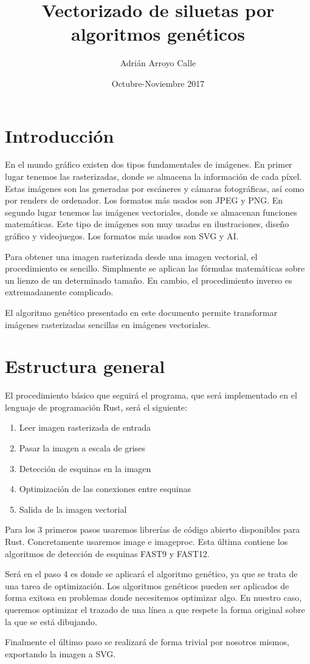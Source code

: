 \documentclass{report}
\title{Vectorizado de siluetas por algoritmos genéticos}
\author{Adrián Arroyo Calle}
\date{ Octubre-Noviembre 2017}
\begin{document}
\maketitle

\chapter{Introducción}
En el mundo gráfico existen dos tipos fundamentales de imágenes. En primer lugar tenemos las rasterizadas, donde se almacena la información de cada píxel. Estas imágenes son las generadas por escáneres y cámaras fotográficas, así como por renders de ordenador. Los formatos más usados son JPEG y PNG. En segundo lugar tenemos las imágenes vectoriales, donde se almacenan funciones matemáticas. Este tipo de imágenes son muy usadas en ilustraciones, diseño gráfico y videojuegos. Los formatos más usados son SVG y AI. 

Para obtener una imagen rasterizada desde una imagen vectorial, el procedimiento es sencillo. Simplmente se aplican las fórmulas matemáticas sobre un lienzo de un determinado tamaño. En cambio, el procedimiento inverso es extremadamente complicado. 

El algoritmo genético presentado en este documento permite transformar imágenes rasterizadas sencillas en imágenes vectoriales.

\chapter{Estructura general}

El procedimiento básico que seguirá el programa, que será implementado en el lenguaje 
de programación Rust\cite{Matsakis:2014:RL:2692956.2663188}, será el siguiente:

\begin{enumerate}
	\item Leer imagen rasterizada de entrada
	\item Pasar la imagen a escala de grises
	\item Detección de esquinas en la imagen
	\item Optimización de las conexiones entre esquinas
	\item Salida de la imagen vectorial
\end{enumerate}

Para los 3 primeros pasos usaremos librerías de código abierto disponibles para Rust. Concretamente
usaremos image e imageproc. Esta última contiene los algoritmos de detección de esquinas FAST9 y 
FAST12.

Será en el paso 4 es donde se aplicará el algoritmo genético, ya que se trata de una tarea de 
optimización. Los algoritmos genéticos pueden ser aplicados de forma exitosa en problemas donde 
necesitemos optimizar algo. En nuestro caso, queremos optimizar el trazado de una línea a que 
respete la forma original sobre la que se está dibujando.

Finalmente el último paso se realizará de forma trivial por nosotros mismos, 
exportando la imagen a SVG.



\nocite{*}
\end{document}
